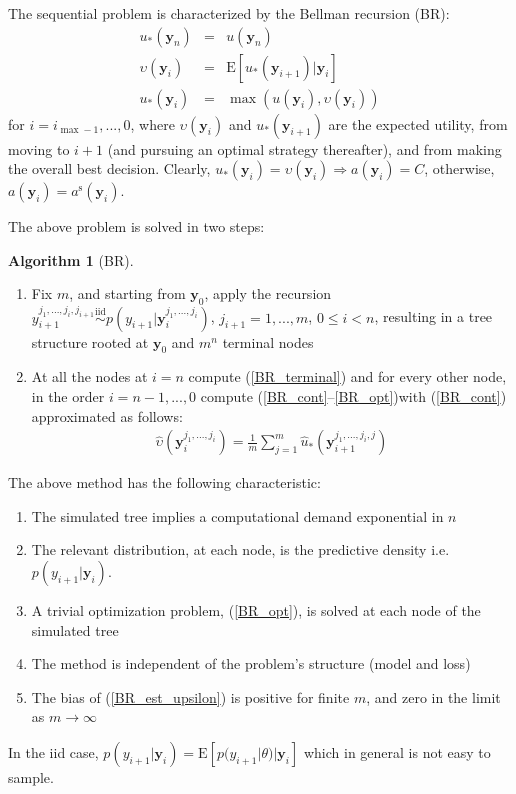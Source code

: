 \documentclass[11pt]{article}
\begin{document}
The sequential problem is characterized by the Bellman recursion
(BR):
\begin{eqnarray}\label{BR_terminal}
u_*(\mathbf{y}_{n}) &=& u(\mathbf{y}_{n})\\
\label{BR_cont}
\upsilon(\mathbf{y}_i)&=&\mathrm{E}[u_*(\mathbf{y}_{i+1})|\mathbf{y}_i]\\
\label{BR_opt}
u_*(\mathbf{y}_i)&=&\max(u(\mathbf{y}_i),\upsilon(\mathbf{y}_i))
\end{eqnarray}for $i=i_{\max-1},...,0$, where $\upsilon(\mathbf{y}_i)$ and
$u_*(\mathbf{y}_{i+1})$ are the expected utility, from moving to
$i+1$ (and pursuing an optimal strategy thereafter), and from making
the overall best decision. Clearly,
$u_*(\mathbf{y}_i)=\upsilon(\mathbf{y}_i)\Rightarrow
a(\mathbf{y}_i)=C$, otherwise,
$a(\mathbf{y}_i)=a^{\mathrm{s}}(\mathbf{y}_i)$.

The above problem is solved in two steps: \theoremstyle{definition}
\newtheorem{algorithm}{Algorithm}
\begin{algorithm}[BR]\label{alg:BR}
\hfill\par
\begin{enumerate}\item Fix $m$, and starting from
$\mathbf{y}_0$, apply the recursion $y_{i+1}^{j_1,...,j_{i},j_{i+1}}
\stackrel{\mathrm{iid}}{\sim}
p(y_{i+1}|\mathbf{y}_i^{j_1,...,j_{i}})$, $j_{i+1}=1,...,m$, $0\leq
i<n$, resulting in a tree structure rooted at $\mathbf{y}_0$ and
$m^{n}$ terminal nodes
\item At all the nodes at $i=n$ compute (\ref{BR_terminal}) and for every other node,
in the order $i=n-1,...,0$ compute (\ref{BR_cont}--\ref{BR_opt})with
(\ref{BR_cont}) approximated as follows:
\begin{align}\label{BR_est_upsilon}
\hat\upsilon(\mathbf{y}_i^{j_1,...,j_i})=\frac{1}{m} \sum_{j=1}^m
\hat u_*(\mathbf{y}_{i+1}^{j_1,...,j_i,j})
\end{align}
\end{enumerate}
\end{algorithm}

The above method has the following characteristic:
\begin{enumerate}
\item The simulated tree implies a computational demand exponential in $n$
\item The relevant distribution, at each node, is the predictive
density i.e. $p(y_{i+1}|\mathbf{y}_{i})$.
\item A trivial optimization problem, (\ref{BR_opt}), is solved at each node of the
simulated tree
\item The method is independent of the problem's structure (model and loss)
\item The bias of (\ref{BR_est_upsilon}) is positive for finite $m$,
and zero in the limit as $m\rightarrow \infty$
\end{enumerate}In the iid case,
$p(y_{i+1}|\mathbf{y}_{i})=\mathrm{E}[p(y_{i+1}|\theta)|\mathbf{y}_{i}]$
which in general is not easy to sample.
\end{document}
